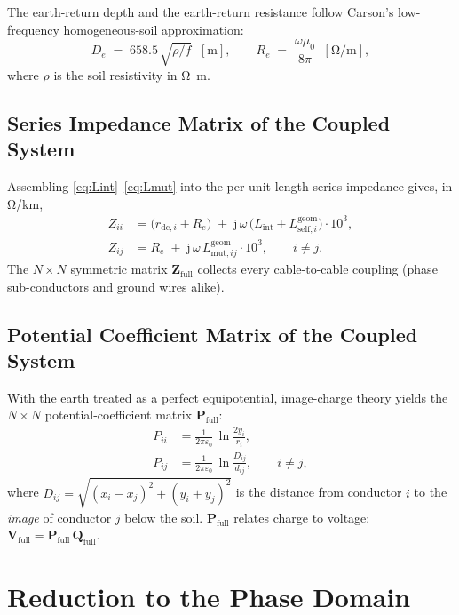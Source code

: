 \documentclass[11pt,a4paper]{article}
\newcommand{\jj}{\mathrm{j}}
\newcommand{\matZ}{\bm{Z}}
\newcommand{\matP}{\bm{P}}
\newcommand{\vV}{\bm{V}}
\newcommand{\vQ}{\bm{Q}}
\newcommand{\Lint}{L_{\mathrm{int}}}
\newcommand{\Lself}[1]{L^{\mathrm{geom}}_{\mathrm{self},#1}}
\newcommand{\Lmut}[1]{L^{\mathrm{geom}}_{\mathrm{mut},#1}}
\begin{document}
The earth-return depth and the earth-return resistance follow Carson's
low-frequency homogeneous-soil approximation:
\begin{equation}
D_{e} \;=\; 658.5\,\sqrt{\rho/f}\;\;[\si{\metre}],\qquad
R_{e} \;=\; \frac{\omega\mu_{0}}{8\pi}\;\;[\si{\ohm/\metre}],
\label{eq:CarsonDeRe}
\end{equation}
where \(\rho\) is the soil resistivity in \si{\ohm.\metre}.

\subsection{Series Impedance Matrix of the Coupled System}

Assembling \eqref{eq:Lint}--\eqref{eq:Lmut} into the per-unit-length series
impedance gives, in \si{\ohm/\kilo\metre},
\begin{align}
Z_{ii} &= \bigl(r_{\mathrm{dc},i} + R_{e}\bigr)
   \;+\; \jj\,\omega\,\bigl(\Lint + \Lself{i}\bigr)\cdot 10^{3}, \label{eq:Zii}\\[3pt]
Z_{ij} &= R_{e}
   \;+\; \jj\,\omega\,\Lmut{ij}\cdot 10^{3},\qquad i\ne j. \label{eq:Zij}
\end{align}
The \(N\times N\) symmetric matrix \(\matZ_{\mathrm{full}}\) collects every
cable-to-cable coupling (phase sub-conductors and ground wires alike).

\subsection{Potential Coefficient Matrix of the Coupled System}

With the earth treated as a perfect equipotential, image-charge theory yields
the \(N\times N\) potential-coefficient matrix \(\matP_{\mathrm{full}}\):
\begin{align}
P_{ii} &= \frac{1}{2\pi\varepsilon_{0}}\,
          \ln\!\frac{2y_{i}}{r_{i}}, \label{eq:Pii}\\[3pt]
P_{ij} &= \frac{1}{2\pi\varepsilon_{0}}\,
          \ln\!\frac{D_{ij}}{d_{ij}},\qquad i\ne j, \label{eq:Pij}
\end{align}
where \(D_{ij}=\sqrt{(x_{i}-x_{j})^{2}+(y_{i}+y_{j})^{2}}\) is the distance
from conductor \(i\) to the \emph{image} of conductor \(j\) below the soil.
\(\matP_{\mathrm{full}}\) relates charge to voltage:
\(\vV_{\mathrm{full}}=\matP_{\mathrm{full}}\,\vQ_{\mathrm{full}}\).

\section{Reduction to the Phase Domain}
\end{document}
